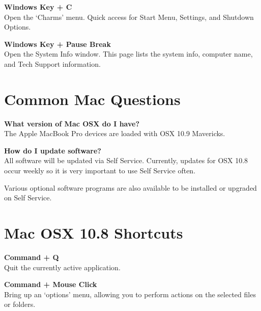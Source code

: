 \documentclass[10pt,foldmark,notumble]{leaflet}
\begin{document}
\textbf{Windows Key + C}\\
Open the `Charms' menu. Quick access for Start Menu, Settings, and Shutdown Options.

\textbf{Windows Key + Pause Break}\\
Open the System Info window. This page lists the system info, computer name, and Tech Support information.

\section{Common Mac Questions\color{red}\hrulefill\color{black}}
\textbf{What version of Mac OSX do I have?}\\
The Apple MacBook Pro devices are loaded with OSX 10.9 Mavericks.

\textbf{How do I update software?}\\
All software will be updated via Self Service. Currently, updates for OSX 10.8 occur weekly so it is very important to use Self Service often.

Various optional software programs are also available to be installed or upgraded on Self Service.



\section{Mac OSX 10.8 Shortcuts\color{red}\hrulefill\color{black}}
\textbf{Command + Q}\\
Quit the currently active application. %

\textbf{Command + Mouse Click}\\
Bring up an `options' menu, allowing you to perform actions on the selected files or folders.
\end{document}
